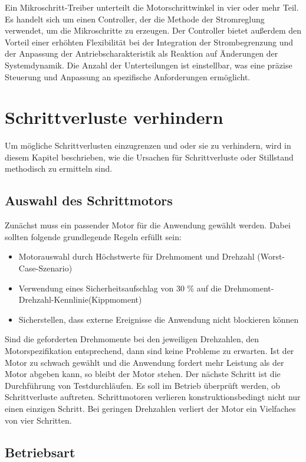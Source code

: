 Ein Mikroschritt-Treiber unterteilt die Motorschrittwinkel in vier oder mehr Teil. Es handelt sich um einen Controller, der die Methode der Stromreglung verwendet, um die Mikroschritte zu erzeugen. Der Controller bietet außerdem den Vorteil einer erhöhten Flexibilität bei der Integration der Strombegrenzung und der Anpassung der Antriebscharakteristik als Reaktion auf Änderungen der Systemdynamik. Die Anzahl der Unterteilungen ist einstellbar, was eine präzise Steuerung und Anpassung an spezifische Anforderungen ermöglicht.\cite{Babiel:2023}

\section{Schrittverluste verhindern}
Um mögliche Schrittverlusten einzugrenzen und oder sie zu verhindern, wird in diesem Kapitel beschrieben, wie die Ursachen für Schrittverluste oder Stillstand methodisch zu ermitteln sind. \cite{Faulhaber:2020}

\subsection{Auswahl des Schrittmotors}
Zunächst muss ein passender Motor für die Anwendung gewählt werden. Dabei sollten folgende grundlegende Regeln erfüllt sein:
\begin{itemize}
	\item Motorauswahl durch Höchstwerte für Drehmoment und Drehzahl (Worst-Case-Szenario)
	\item Verwendung eines Sicherheitsaufschlag von 30 \% auf die Drehmoment-Drehzahl-Kennlinie(Kippmoment)
	\item Sicherstellen, dass externe Ereignisse die Anwendung nicht blockieren können
\end{itemize}

Sind die geforderten Drehmomente bei den jeweiligen Drehzahlen, den Motorspezifikation entsprechend, dann sind keine Probleme zu erwarten. Ist der Motor zu schwach gewählt und die Anwendung fordert mehr Leistung als der Motor abgeben kann, so bleibt der Motor stehen. Der nächste Schritt ist die Durchführung von Testdurchläufen. Es soll im Betrieb überprüft werden, ob Schrittverluste auftreten. Schrittmotoren verlieren konstruktionsbedingt nicht nur einen einzigen Schritt. Bei geringen Drehzahlen verliert der Motor ein Vielfaches von vier Schritten.\cite{Faulhaber:2020}


\subsection{Betriebsart}

